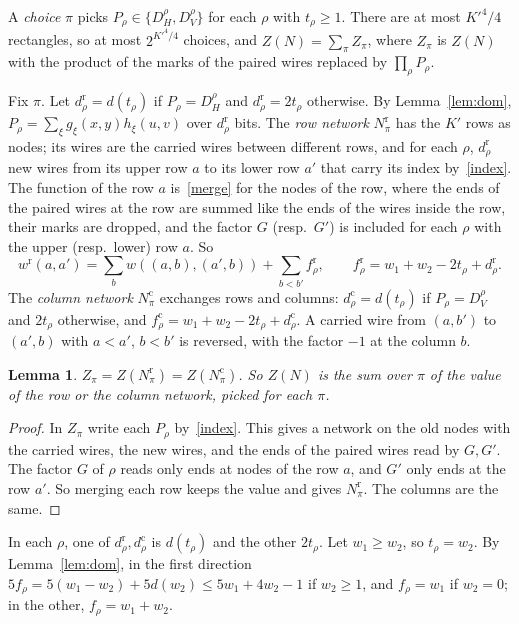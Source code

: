 \documentclass[10pt]{article}
\newtheorem{lemma}[theorem]{Lemma}
\begin{document}
A \emph{choice} $\pi$ picks $P_\rho\in\{D_H^\rho,D_V^\rho\}$ for each $\rho$ with $t_\rho\ge1$. There are at most $K'^4/4$ rectangles, so at most $2^{K'^4/4}$ choices, and $Z(N)=\sum_\pi Z_\pi$, where $Z_\pi$ is $Z(N)$ with the product of the marks of the paired wires replaced by $\prod_\rho P_\rho$.

Fix $\pi$. Let $d^{\mathrm r}_\rho=d(t_\rho)$ if $P_\rho=D_H^\rho$ and $d^{\mathrm r}_\rho=2t_\rho$ otherwise. By Lemma~\ref{lem:dom}, $P_\rho=\sum_\xi g_\xi(x,y)h_\xi(u,v)$ over $d^{\mathrm r}_\rho$ bits. The \emph{row network} $N^{\mathrm r}_\pi$ has the $K'$ rows as nodes; its wires are the carried wires between different rows, and for each $\rho$, $d^{\mathrm r}_\rho$ new wires from its upper row $a$ to its lower row $a'$ that carry its index by~\eqref{index}. The function of the row $a$ is~\eqref{merge} for the nodes of the row, where the ends of the paired wires at the row are summed like the ends of the wires inside the row, their marks are dropped, and the factor $G$ (resp.\ $G'$) is included for each $\rho$ with the upper (resp.\ lower) row $a$. So
\begin{equation}\label{wrow}
w^{\mathrm r}(a,a')=\sum_bw((a,b),(a',b))+\sum_{b<b'}f^{\mathrm r}_\rho,\qquad f^{\mathrm r}_\rho=w_1+w_2-2t_\rho+d^{\mathrm r}_\rho .
\end{equation}
The \emph{column network} $N^{\mathrm c}_\pi$ exchanges rows and columns: $d^{\mathrm c}_\rho=d(t_\rho)$ if $P_\rho=D_V^\rho$ and $2t_\rho$ otherwise, and $f^{\mathrm c}_\rho=w_1+w_2-2t_\rho+d^{\mathrm c}_\rho$. A carried wire from $(a,b')$ to $(a',b)$ with $a<a'$, $b<b'$ is reversed, with the factor $-1$ at the column $b$.

\begin{lemma}\label{lem:step}
$Z_\pi=Z(N^{\mathrm r}_\pi)=Z(N^{\mathrm c}_\pi)$. So $Z(N)$ is the sum over $\pi$ of the value of the row or the column network, picked for each $\pi$.
\end{lemma}
\begin{proof}
In $Z_\pi$ write each $P_\rho$ by~\eqref{index}. This gives a network on the old nodes with the carried wires, the new wires, and the ends of the paired wires read by $G,G'$. The factor $G$ of $\rho$ reads only ends at nodes of the row $a$, and $G'$ only ends at the row $a'$. So merging each row keeps the value and gives $N^{\mathrm r}_\pi$. The columns are the same.
\end{proof}

In each $\rho$, one of $d^{\mathrm r}_\rho,d^{\mathrm c}_\rho$ is $d(t_\rho)$ and the other $2t_\rho$. Let $w_1\ge w_2$, so $t_\rho=w_2$. By Lemma~\ref{lem:dom}, in the first direction $5f_\rho=5(w_1-w_2)+5d(w_2)\le5w_1+4w_2-1$ if $w_2\ge1$, and $f_\rho=w_1$ if $w_2=0$; in the other, $f_\rho=w_1+w_2$.
\end{document}
